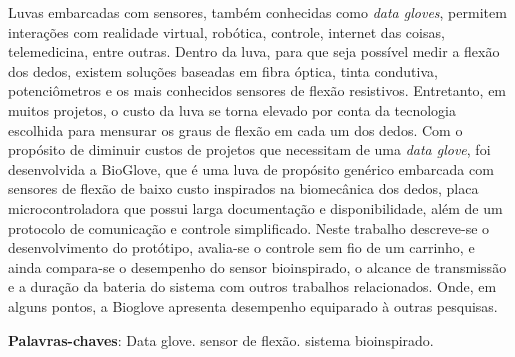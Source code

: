 \documentclass[
	12pt,				%
	openright,			%
	oneside,			%
	a4paper,			%
	english,			%
	brazil				%
	]{abntex2}
\begin{document}

\setlength{\absparsep}{18pt} %
\begin{resumo}
	\hspace{1.5cm}Luvas embarcadas com sensores, também conhecidas como \textit{data gloves}, permitem interações com realidade virtual, robótica, controle, internet das coisas, telemedicina, entre outras. Dentro da luva, para que seja possível medir a flexão dos dedos, existem soluções baseadas em fibra óptica, tinta condutiva, potenciômetros e os mais conhecidos sensores de flexão resistivos. Entretanto, em muitos projetos, o custo da luva se torna elevado por conta da tecnologia escolhida para mensurar os graus de flexão em cada um dos dedos. Com o propósito de diminuir custos de projetos que necessitam de uma \textit{data glove}, foi desenvolvida a BioGlove, que é uma luva de propósito genérico embarcada com sensores de flexão de baixo custo inspirados na biomecânica dos dedos, placa microcontroladora que possui larga documentação e disponibilidade, além de um protocolo de comunicação e controle simplificado. Neste trabalho descreve-se o desenvolvimento do protótipo, avalia-se o controle sem fio de um carrinho, e ainda compara-se o desempenho do sensor bioinspirado, o alcance de transmissão e a duração da bateria do sistema com outros trabalhos relacionados. Onde, em alguns pontos, a Bioglove apresenta desempenho equiparado à outras pesquisas.


 \textbf{Palavras-chaves}: Data glove. sensor de flexão. sistema bioinspirado.
\end{resumo}
\end{document}
